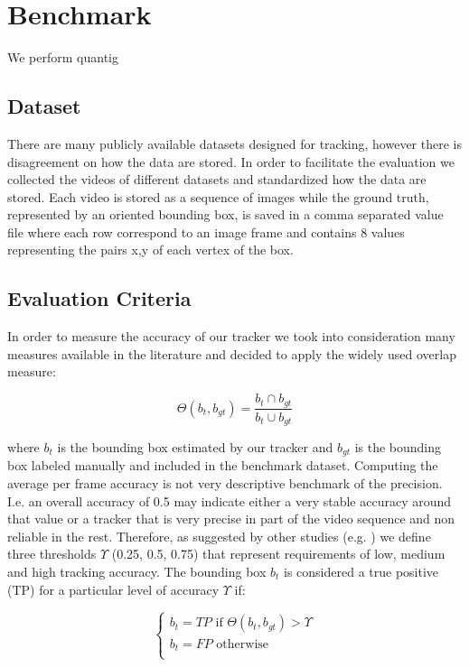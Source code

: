 \section{Benchmark}

We perform quantig

\subsection{Dataset}

There are many publicly available datasets designed for tracking, however there is disagreement on how the data are stored. In order to facilitate the evaluation we collected the videos of different datasets and standardized how the data are stored. Each video is stored as a sequence of images while the ground truth, represented by an oriented bounding box, is saved in a comma separated value file where each row correspond to an image frame and contains 8 values representing the pairs x,y of each vertex of the box.  

\subsection{Evaluation Criteria}

In order to measure the
accuracy of our tracker we took into consideration many measures available in
the literature and decided to apply the widely used overlap measure:

\begin{equation}
	\Theta (b_{t}, b_{gt}) = \frac{b_{t} \cap b_{gt}}{b_{t} \cup b_{gt}}
\end{equation}

where \textit{$b_{t}$} is the bounding box estimated by our tracker and
\textit{$b_{gt}$} is the bounding box labeled manually and included in the
benchmark dataset. Computing the average per frame accuracy is not very
descriptive benchmark of the precision. I.e. an overall accuracy of 0.5 may
indicate either a very stable accuracy around that value or a tracker that is
very precise in part of the video sequence and non reliable in the
rest. Therefore, as suggested by other studies (e.g. \cite{nebehay14wccv}) we
define three thresholds $\Upsilon$ (0.25, 0.5, 0.75) that represent
requirements of low, medium and high tracking accuracy. The bounding box
\textit{$b_{t}$} is considered a true positive (TP) for a particular level of
accuracy $\Upsilon$ if:


\begin{equation}
\begin{cases}
b_{t} = TP  \text{ if } \Theta(b_{t}, b_{gt}) > \Upsilon \\
b_{t} = FP  \text{ otherwise }\\
\end{cases}
\end{equation}

